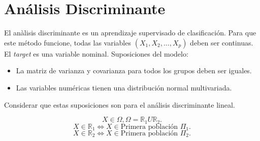\documentclass{article}
\begin{document}
\section{Análisis Discriminante}

El anàlisis discriminante es un aprendizaje supervisado de clasificación. Para que este método funcione, todas las variables $(X_{1},X_{2},\ldots,X_{p})$ deben ser continuas. El \textit{target} es una variable nominal. Suposiciones del modelo:
\begin{itemize}
	\item La matriz de varianza y covarianza para todos los grupos deben ser iguales.
	\item Las variables numéricas tienen una distribución normal multivariada.
\end{itemize}

Considerar que estas suposiciones son para el análisis discriminante lineal.

\[ X \in \Omega, \Omega = \mathbb{R}_{1} U \mathbb{R}_{2}.\]
\[ X \in \mathbb{R}_{1} \iff X \in \text{Primera población $\Pi_{1}$}.\]
\[ X \in \mathbb{R}_{2} \iff X \in \text{Primera población $\Pi_{2}$}.\]
\end{document}
